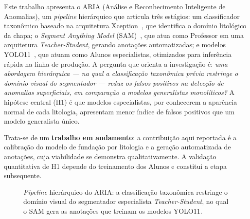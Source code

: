 \documentclass[10pt,conference]{IEEEtran}
\begin{document}
Este trabalho apresenta o ARIA (Análise e Reconhecimento Inteligente de Anomalias), um \textit{pipeline} hierárquico que articula três estágios: um classificador taxonômico baseado na arquitetura Xception~\cite{xception_chollet2017}, que identifica o domínio litológico da chapa; o \textit{Segment Anything Model} (SAM)~\cite{sam_kirillov2023}, que atua como Professor em uma arquitetura \textit{Teacher-Student}, gerando anotações automatizadas; e modelos YOLO11~\cite{yolo11_khanam2024}, que atuam como Alunos especialistas, otimizados para inferência rápida na linha de produção. A pergunta que orienta a investigação é: \textit{uma abordagem hierárquica --- na qual a classificação taxonômica prévia restringe o domínio visual do segmentador --- reduz os falsos positivos na detecção de anomalias superficiais, em comparação a modelos generalistas monolíticos?} A hipótese central (H1) é que modelos especialistas, por conhecerem a aparência normal de cada litologia, apresentam menor índice de falsos positivos que um modelo generalista único.

Trata-se de um \textbf{trabalho em andamento}: a contribuição aqui reportada é a calibração do modelo de fundação por litologia e a geração automatizada de anotações, cuja viabilidade se demonstra qualitativamente. A validação quantitativa de H1 depende do treinamento dos Alunos e constitui a etapa subsequente.

\begin{figure}[!t]
  \centering
  \caption{\textit{Pipeline} hierárquico do ARIA: a classificação taxonômica restringe o domínio visual do segmentador especialista \textit{Teacher-Student}, no qual o SAM gera as anotações que treinam os modelos YOLO11.}
  \label{fig:arquitetura}
\end{figure}
\end{document}
